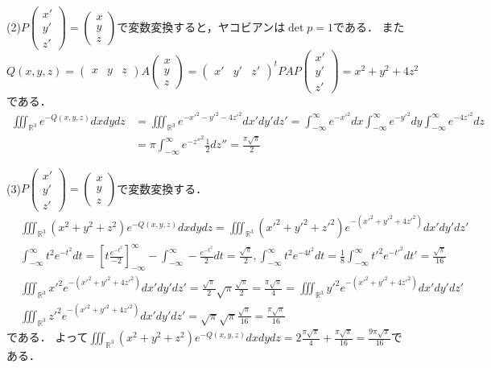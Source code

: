 \documentclass[
		book,
		head_space=20mm,
		foot_space=20mm,
		gutter=10mm,
		line_length=190mm
]{jlreq}
\begin{document}
(2)$P\begin{pmatrix}
x'\\y'\\z'
\end{pmatrix}=\begin{pmatrix}
x\\y\\z
\end{pmatrix}$で変数変換すると，ヤコビアンは$\det p=1$である．
また$Q(x,y,z)= \begin{pmatrix}
x&y&z
\end{pmatrix}A\begin{pmatrix}
x\\y\\z
\end{pmatrix}=\begin{pmatrix}
x'&y'&z'
\end{pmatrix}^t\!PAP\begin{pmatrix}
x'\\y'\\z'
\end{pmatrix}=x^2+y^2+4z^2$である．
\begin{align}
	\iiint_{\mathbb{R}^3}e^{-Q(x,y,z)}dxdydz&=\iiint_{\mathbb{R}^3} e^{-x'^2-y'^2-4z'^2}dx'dy'dz'=\int_{-\infty}^\infty e^{-x'^2}dx\int_{-\infty}^\infty e^{-y'^2}dy\int_{-\infty}^\infty e^{-4z'^2}dz\\
	&=\pi\int_{-\infty}^\infty e^{-z''^2}\frac{1}{2}dz''=\frac{\pi\sqrt{\pi}}{2}
\end{align}

(3)$P\begin{pmatrix}
x'\\y'\\z'
\end{pmatrix}=\begin{pmatrix}
x\\y\\z
\end{pmatrix}$で変数変換する．
\begin{align}
	&\iiint_{\mathbb{R}^3}(x^2+y^2+z^2)e^{-Q(x,y,z)}dxdydz=\iiint_{\mathbb{R}^3}(x'^2+y'^2+z'^2)e^{-(x'^2+y'^2+4z'^2)}dx'dy'dz'\\
	&\int_{-\infty}^\infty t^2e^{-t^2}dt=\left[ t \frac{e^{-t^2}}{-2} \right]_{-\infty}^\infty-\int_{-\infty}^\infty -\frac{e^{-t^2}}{2}dt=\frac{\sqrt{\pi}}{2},\int_{-\infty}^\infty t^2e^{-4t^2}dt=\frac{1}{8}\int_{-\infty}^\infty t'^2e^{-t'^2}dt'=\frac{\sqrt{\pi}}{16}\\
	&\iiint_{\mathbb{R}^3}x'^2e^{-(x'^2+y'^2+4z'^2)}dx'dy'dz'=\frac{\sqrt{\pi}}{2}\sqrt{\pi}\frac{\sqrt{\pi}}{2}=\frac{\pi\sqrt{\pi}}{4}=\iiint_{\mathbb{R}^3}y'^2e^{-(x'^2+y'^2+4z'^2)}dx'dy'dz'\\
	&\iiint_{\mathbb{R}^3} z'^2e^{-(x'^2+y'^2+4z'^2)}dx'dy'dz'=\sqrt{\pi}\sqrt{\pi}\frac{\sqrt{\pi}}{16}=\frac{\pi\sqrt{\pi}}{16}
\end{align}
である．
よって$\iiint_{\mathbb{R}^3}(x^2+y^2+z^2)e^{-Q(x,y,z)}dxdydz=2\frac{\pi\sqrt{\pi}}{4}+\frac{\pi\sqrt{\pi}}{16}=\frac{9\pi\sqrt{\pi}}{16}$である．
\end{document}
